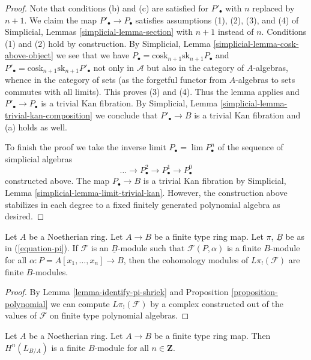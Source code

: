 \begin{proof}
\medskip\noindent
Note that conditions (b) and (c) are satisfied for $P'_\bullet$ with $n$
replaced by $n + 1$. We claim the map $P'_\bullet \to P_\bullet$ satisfies
assumptions (1), (2), (3), and (4) of
Simplicial, Lemmas \ref{simplicial-lemma-section}
with $n + 1$ instead of $n$. Conditions (1) and (2) hold by construction.
By Simplicial, Lemma \ref{simplicial-lemma-cosk-above-object}
we see that we have
$P_\bullet = \text{cosk}_{n + 1}\text{sk}_{n + 1}P_\bullet$
and
$P'_\bullet = \text{cosk}_{n + 1}\text{sk}_{n + 1}P'_\bullet$
not only in $\mathcal{A}$ but also in the category of $A$-algebras,
whence in the category of sets (as the forgetful functor from $A$-algebras
to sets commutes with all limits). This proves (3) and (4). Thus the lemma
applies and $P'_\bullet \to P_\bullet$ is a trivial Kan fibration. By
Simplicial, Lemma \ref{simplicial-lemma-trivial-kan-composition}
we conclude that $P'_\bullet \to B$ is a trivial Kan fibration and (a)
holds as well.

\medskip\noindent
To finish the proof we take the inverse limit $P_\bullet = \lim P^n_\bullet$
of the sequence of simplicial algebras
$$
\ldots \to P^2_\bullet \to P^1_\bullet \to P^0_\bullet
$$
constructed above. The map $P_\bullet \to B$ is a trivial Kan fibration by
Simplicial, Lemma \ref{simplicial-lemma-limit-trivial-kan}.
However, the construction above stabilizes in each degree
to a fixed finitely generated polynomial algebra as desired.
\end{proof}

\begin{lemma}
\label{lemma-pi-shriek-finite}
Let $A$ be a Noetherian ring. Let $A \to B$ be a finite type ring map.
Let $\pi$, $\underline{B}$ be as in (\ref{equation-pi}).
If $\mathcal{F}$ is an $\underline{B}$-module such that
$\mathcal{F}(P, \alpha)$ is a finite $B$-module for all
$\alpha : P = A[x_1, \ldots, x_n] \to B$, then the cohomology modules
of $L\pi_!(\mathcal{F})$ are finite $B$-modules.
\end{lemma}

\begin{proof}
By Lemma \ref{lemma-identify-pi-shriek} and
Proposition \ref{proposition-polynomial}
we can compute $L\pi_!(\mathcal{F})$ by a complex
constructed out of the values of $\mathcal{F}$ on finite type
polynomial algebras.
\end{proof}

\begin{lemma}
\label{lemma-cotangent-finite}
Let $A$ be a Noetherian ring. Let $A \to B$ be a finite type ring map.
Then $H^n(L_{B/A})$ is a finite $B$-module for all $n \in \mathbf{Z}$.
\end{lemma}

